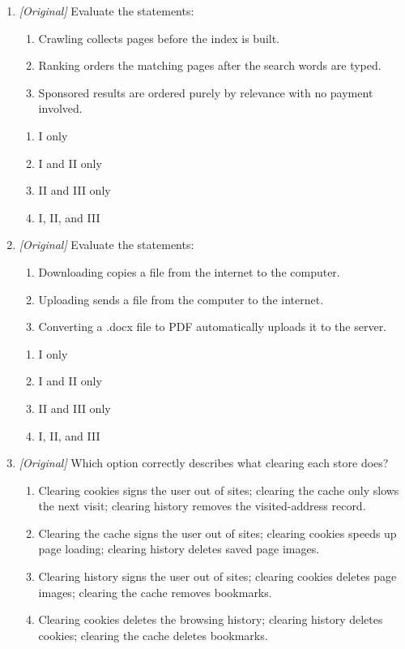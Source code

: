 \begin{enumerate}[label=\textbf{Q\arabic*.}, leftmargin=*]
\begin{enumerate}[label=\Alph*.]
    \item Ctrl+H --- open a new tab; Ctrl+T --- open browsing history
  \end{enumerate}
\item \textit{[Original]} Evaluate the statements:
  \begin{enumerate}[label=\Roman*.]
    \item Crawling collects pages before the index is built.
    \item Ranking orders the matching pages after the search words are typed.
    \item Sponsored results are ordered purely by relevance with no payment involved.
  \end{enumerate}
  \begin{enumerate}[label=\Alph*.]
    \item I only
    \item I and II only
    \item II and III only
    \item I, II, and III
  \end{enumerate}
\item \textit{[Original]} Evaluate the statements:
  \begin{enumerate}[label=\Roman*.]
    \item Downloading copies a file from the internet to the computer.
    \item Uploading sends a file from the computer to the internet.
    \item Converting a .docx file to PDF automatically uploads it to the server.
  \end{enumerate}
  \begin{enumerate}[label=\Alph*.]
    \item I only
    \item I and II only
    \item II and III only
    \item I, II, and III
  \end{enumerate}
\item \textit{[Original]} Which option correctly describes what clearing each
  store does?
  \begin{enumerate}[label=\Alph*.]
    \item Clearing cookies signs the user out of sites; clearing the cache only slows the next visit; clearing history removes the visited-address record.
    \item Clearing the cache signs the user out of sites; clearing cookies speeds up page loading; clearing history deletes saved page images.
    \item Clearing history signs the user out of sites; clearing cookies deletes page images; clearing the cache removes bookmarks.
    \item Clearing cookies deletes the browsing history; clearing history deletes cookies; clearing the cache deletes bookmarks.
  \end{enumerate}


\end{enumerate}
